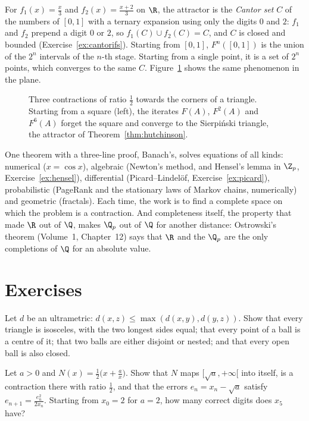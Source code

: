 For $f_1(x)=\frac x3$ and $f_2(x)=\frac{x+2}3$ on $\R$, the attractor is the \emph{Cantor set} $C$ of the numbers of $[0,1]$ with a ternary
expansion using only the digits $0$ and $2$: $f_1$ and $f_2$ prepend a digit $0$ or $2$, so $f_1(C)\cup f_2(C)=C$, and $C$ is closed and bounded
(Exercise~\ref{ex:cantorifs}). Starting from $[0,1]$, $F^n([0,1])$ is the union of the $2^n$ intervals of the $n$-th stage. Starting from a
single point, it is a set of $2^n$ points, which converges to the same $C$. Figure~\ref{fig:sierpinski} shows the same phenomenon in the
plane.

\begin{figure}[ht]
\centering
{}
\caption{Three contractions of ratio $\frac12$ towards the corners of a triangle. Starting from a square (left), the iterates $F(A)$, $F^2(A)$ and
$F^6(A)$ forget the square and converge to the Sierpi\'nski triangle, the attractor of Theorem~\ref{thm:hutchinson}.}
\label{fig:sierpinski}
\end{figure}

\begin{beauty}
One theorem with a three-line proof, Banach's, solves equations of all kinds: numerical ($x=\cos x$), algebraic (Newton's
method, and Hensel's lemma in $\Z_p$, Exercise~\ref{ex:hensel}), differential (Picard--Lindel\"of, Exercise~\ref{ex:picard}), probabilistic
(PageRank and the stationary laws of Markov chains, numerically) and geometric (fractals). Each time, the work is
to find a complete space on which the problem is a contraction. And completeness itself, the property that made $\R$ out
of $\Q$, makes $\Q_p$ out of $\Q$ for another distance: Ostrowski's theorem (Volume~1, Chapter~12) says that $\R$ and the $\Q_p$ are
the only completions of $\Q$ for an absolute value.
\end{beauty}

\section{Exercises}

\begin{exercise}[$\star$]\label{ex:ultra}
Let $d$ be an ultrametric: $d(x,z)\le\max(d(x,y),d(y,z))$. Show that every triangle is isosceles, with the two longest sides equal; that every
point of a ball is a centre of it; that two balls are either disjoint or nested; and that every open ball is also closed.
\end{exercise}

\begin{exercise}[$\star$]\label{ex:newton}
Let $a>0$ and $N(x)=\frac12\bigl(x+\frac ax\bigr)$. Show that $N$ maps $[\sqrt a,+\infty[$ into itself, is a contraction there with ratio $\frac12$, and that the
errors $e_n=x_n-\sqrt a$ satisfy $e_{n+1}=\frac{e_n^2}{2x_n}$. Starting from $x_0=2$ for $a=2$, how many correct digits does $x_5$ have?
\end{exercise}

